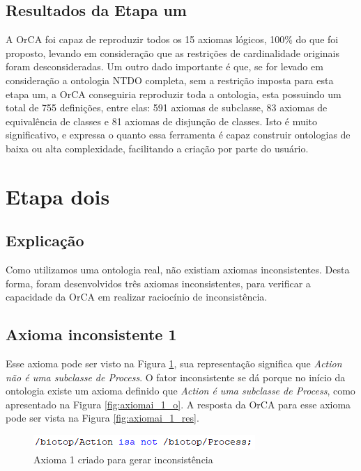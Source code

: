 \documentclass{bcc}
\begin{document}

\subsection{Resultados da Etapa um}

A OrCA foi capaz de reproduzir todos os 15 axiomas lógicos, 100\% do que foi proposto, levando em consideração que as restrições de cardinalidade originais foram desconsideradas. Um outro dado importante é que, se for levado em consideração a ontologia NTDO completa, sem a restrição imposta para esta etapa um, a OrCA conseguiria reproduzir toda a ontologia, esta possuindo um total de 755 definições, entre elas: 591 axiomas de subclasse, 83 axiomas de equivalência de classes e 81 axiomas de disjunção de classes. Isto é muito significativo, e expressa o quanto essa ferramenta é capaz construir ontologias de baixa ou alta complexidade, facilitando a criação por parte do usuário.

\section{Etapa dois}
\subsection{Explicação}
Como utilizamos uma ontologia real, não existiam axiomas inconsistentes. Desta forma, foram desenvolvidos três axiomas inconsistentes, para verificar a capacidade da OrCA em realizar raciocínio de inconsistência. 

\subsection{Axioma inconsistente 1}
Esse axioma pode ser visto na Figura \ref{fig:axiomai_1}, sua representação significa que \textit{Action não é uma subclasse de Process}. O fator inconsistente se dá porque no início da ontologia existe um axioma definido que \textit{Action é uma subclasse de Process}, como apresentado na Figura \ref{fig:axiomai_1_o}. A resposta da OrCA para esse axioma pode ser vista na Figura \ref{fig:axiomai_1_res}.

\begin{figure}[H]
\centering
\includegraphics[width=.5\textwidth]{Figuras/axiomai_1.png}
\caption{Axioma 1 criado para gerar inconsistência} 
\label{fig:axiomai_1}
\end{figure}
\end{document}
